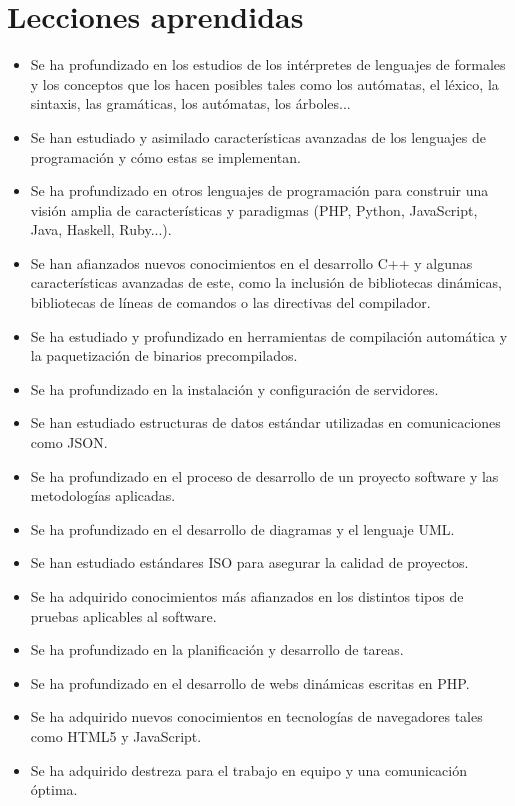 \section{Lecciones aprendidas}
\begin{itemize}
\item Se ha profundizado en los estudios de los intérpretes de lenguajes de formales y los conceptos que los hacen posibles tales como 
los autómatas, el léxico, la sintaxis, las gramáticas, los autómatas, los árboles...
\item Se han estudiado y asimilado características avanzadas de los lenguajes de programación y cómo estas se implementan.
\item Se ha profundizado en otros lenguajes de programación para construir una visión amplia de características y paradigmas (PHP, Python, JavaScript, Java, Haskell, Ruby...). 
\item Se han afianzados nuevos conocimientos en el desarrollo C++ y algunas características avanzadas de este, como la inclusión de bibliotecas dinámicas, bibliotecas 
de líneas de comandos o las directivas del compilador.
\item Se ha estudiado y profundizado en herramientas de compilación automática y la paquetización de binarios precompilados.
\item Se ha profundizado en la instalación y configuración de servidores.
\item Se han estudiado estructuras de datos estándar utilizadas en comunicaciones como JSON.
\item Se ha profundizado en el proceso de desarrollo de un proyecto software y las metodologías aplicadas.
\item Se ha profundizado en el desarrollo de diagramas y el lenguaje UML.
\item Se han estudiado estándares ISO para asegurar la calidad de proyectos.
\item Se ha adquirido conocimientos más afianzados en los distintos tipos de pruebas aplicables al software.
\item Se ha profundizado en la planificación y desarrollo de tareas.
\item Se ha profundizado en el desarrollo de webs dinámicas escritas en PHP.
\item Se ha adquirido nuevos conocimientos en tecnologías de navegadores tales como HTML5 y JavaScript.
\item Se ha adquirido destreza para el trabajo en equipo y una comunicación óptima.
\end{itemize}

